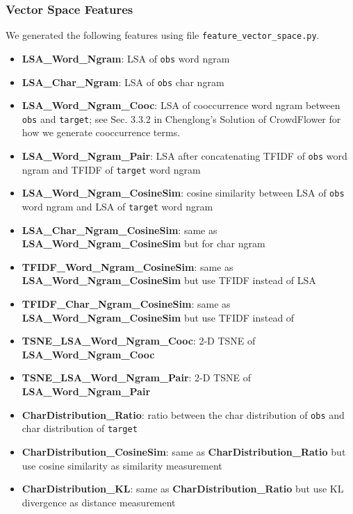 \documentclass[12pt]{article}
\begin{document}
{{\subsubsection{Vector Space Features}
We generated the following features using file \texttt{feature\_vector\_space.py}.
\begin{itemize}
\item \textbf{LSA\_Word\_Ngram}: LSA of \texttt{obs} word ngram
\item \textbf{LSA\_Char\_Ngram}: LSA of \texttt{obs} char ngram
\item \textbf{LSA\_Word\_Ngram\_Cooc}: LSA of cooccurrence word ngram between \texttt{obs} and \texttt{target}; see Sec. 3.3.2 in Chenglong's Solution of CrowdFlower\cite{CrowdFlower_1st} for how we generate cooccurrence terms.
\item \textbf{LSA\_Word\_Ngram\_Pair}: LSA after concatenating TFIDF of \texttt{obs} word ngram and TFIDF of \texttt{target} word ngram
\item \textbf{LSA\_Word\_Ngram\_CosineSim}: cosine similarity between LSA of \texttt{obs} word ngram and LSA of \texttt{target} word ngram
\item \textbf{LSA\_Char\_Ngram\_CosineSim}: same as \textbf{LSA\_Word\_Ngram\_CosineSim} but for char ngram
\item \textbf{TFIDF\_Word\_Ngram\_CosineSim}: same as \textbf{LSA\_Word\_Ngram\_CosineSim} but use TFIDF instead of LSA
\item \textbf{TFIDF\_Char\_Ngram\_CosineSim}: same as \textbf{LSA\_Word\_Ngram\_CosineSim} but use TFIDF instead of
\item \textbf{TSNE\_LSA\_Word\_Ngram\_Cooc}: 2-D TSNE of \textbf{LSA\_Word\_Ngram\_Cooc}
\item \textbf{TSNE\_LSA\_Word\_Ngram\_Pair}: 2-D TSNE of \textbf{LSA\_Word\_Ngram\_Pair}
\item \textbf{CharDistribution\_Ratio}: ratio between the char distribution of \texttt{obs} and char distribution of \texttt{target}
\item \textbf{CharDistribution\_CosineSim}: same as \textbf{CharDistribution\_Ratio} but use cosine similarity as similarity measurement
\item \textbf{CharDistribution\_KL}: same as \textbf{CharDistribution\_Ratio} but use KL divergence as distance measurement
\end{itemize}

}}
\end{document}
